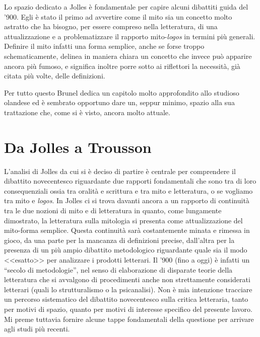 \documentclass[12pt,a4paper,openright, oneside]{book}
\begin{document}
Lo spazio dedicato a Jolles è fondamentale per capire alcuni dibattiti guida del '900.  Egli è stato il primo ad avvertire come il mito sia un concetto molto astratto che ha bisogno, per essere compreso nella letteratura, di una attualizzazione e a problematizzare il rapporto mito-\textit{logos} in termini più generali.  Definire il mito infatti una forma semplice, anche se forse troppo schematicamente, delinea in maniera chiara un concetto che invece può apparire ancora più fumoso, e significa inoltre porre sotto ai riflettori la necessità, già citata più volte, delle definizioni.

Per tutto questo Brunel dedica un capitolo molto approfondito allo studioso olandese ed è sembrato opportuno dare un, seppur minimo, spazio alla sua trattazione che, come si è visto, ancora molto attuale.

\section{Da Jolles a Trousson}

L'analisi di Jolles da cui si è deciso di partire è centrale per comprendere il dibattito novecentesco riguardante due rapporti fondamentali che sono tra di loro consequenziali ossia tra oralità e scrittura e tra mito e letteratura, o se vogliamo tra mito e  \textit{logos}. In Jolles ci si trova davanti ancora a un rapporto di continuità tra le due nozioni di mito e di letteratura in quanto, come lungamente dimostrato, la letteratura sulla mitologia si presenta come attualizzazione del mito-forma semplice. Questa continuità sarà costantemente minata e rimessa in gioco, da una parte per la mancanza di definizioni precise, dall'altra per la presenza di un più ampio dibattito metodologico riguardante quale sia il modo <<esatto>> per analizzare i prodotti letterari. Il '900 (fino a oggi) è infatti un ``secolo di metodologie'', nel senso di elaborazione di disparate teorie della letteratura che si avvalgono di procedimenti anche non strettamente considerati letterari (quali lo strutturalismo o la psicanalisi). Non è mia intenzione tracciare un percorso sistematico del dibattito novecentesco sulla critica letteraria, tanto per motivi di spazio, quanto per motivi di interesse specifico del presente lavoro. Mi preme tuttavia fornire alcune tappe fondamentali della questione per arrivare agli studi più recenti.
\end{document}

